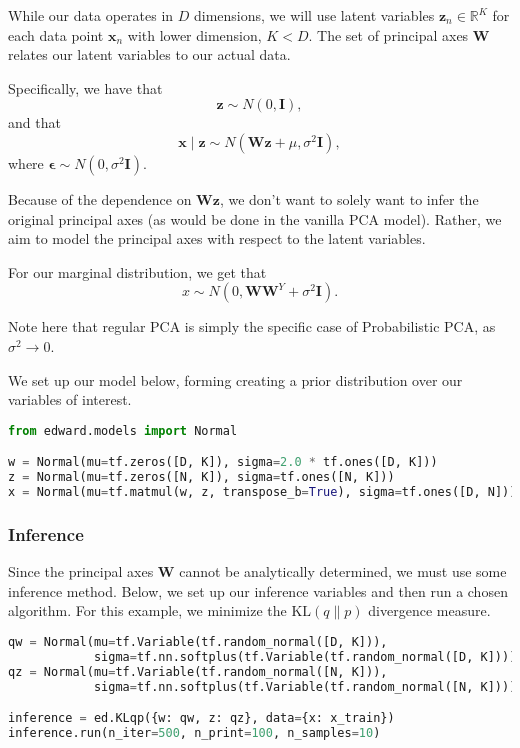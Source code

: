 While our data operates in $D$ dimensions, we will use latent variables
$\mathbf{z}_n \in \mathbb{R}^K$ for each data point $\mathbf{x}_n$
with lower dimension, $K < D$. The set of principal axes
$\mathbf{W}$ relates our latent variables to our actual data.

Specifically, we have that
\begin{equation*}
\mathbf{z} \sim N(0, \mathbf{I}),
\end{equation*}
and that
\begin{equation*}
\mathbf{x} \mid \mathbf{z} \sim N(\mathbf{Wz} + \mu, \sigma^2\mathbf{I}),
\end{equation*}
where $\mathbf{\epsilon} \sim N(0, \sigma^2\mathbf{I})$.

Because of the dependence on $\mathbf{Wz}$, we don't want to solely
want to infer the original principal axes (as would be done in the
vanilla PCA model). Rather, we aim to model the principal axes with
respect to the latent variables.

For our marginal distribution, we get that
\begin{equation*}
x \sim N(0, \mathbf{W}\mathbf{W}^Y + \sigma^2\mathbf{I}).
\end{equation*}

Note here that regular PCA is simply the specific case of
Probabilistic PCA, as $\sigma^2 \to 0$.

We set up our model below, forming creating a prior distribution over
our variables of interest.

\begin{lstlisting}[language=Python]
from edward.models import Normal

w = Normal(mu=tf.zeros([D, K]), sigma=2.0 * tf.ones([D, K]))
z = Normal(mu=tf.zeros([N, K]), sigma=tf.ones([N, K]))
x = Normal(mu=tf.matmul(w, z, transpose_b=True), sigma=tf.ones([D, N]))

\end{lstlisting}

\subsubsection{Inference}

Since the principal axes $\mathbf{W}$ cannot be analytically
determined, we must use some inference method. Below, we set up our
inference variables and then run a chosen algorithm. For this
example, we minimize the $\text{KL}(q\|p)$ divergence measure.

\begin{lstlisting}[language=Python]
qw = Normal(mu=tf.Variable(tf.random_normal([D, K])),
            sigma=tf.nn.softplus(tf.Variable(tf.random_normal([D, K]))))
qz = Normal(mu=tf.Variable(tf.random_normal([N, K])),
            sigma=tf.nn.softplus(tf.Variable(tf.random_normal([N, K]))))

inference = ed.KLqp({w: qw, z: qz}, data={x: x_train})
inference.run(n_iter=500, n_print=100, n_samples=10)
\end{lstlisting}

